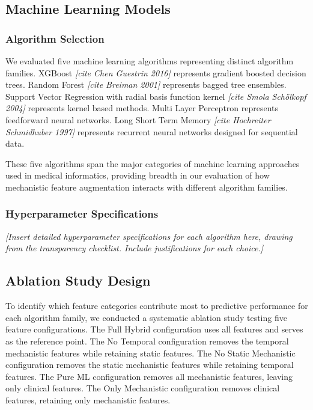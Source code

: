 \documentclass[11pt,a4paper]{article}
\newcommand{\placeholder}[1]{\textcolor{placeholdergray}{\textit{[#1]}}}
\begin{document}
\subsection{Machine Learning Models}

\subsubsection{Algorithm Selection}

We evaluated five machine learning algorithms representing distinct
algorithm families. XGBoost \placeholder{cite Chen Guestrin 2016}
represents gradient boosted decision trees. Random Forest
\placeholder{cite Breiman 2001} represents bagged tree ensembles.
Support Vector Regression with radial basis function kernel
\placeholder{cite Smola Schölkopf 2004} represents kernel based
methods. Multi Layer Perceptron represents feedforward neural networks.
Long Short Term Memory \placeholder{cite Hochreiter Schmidhuber 1997}
represents recurrent neural networks designed for sequential data.

These five algorithms span the major categories of machine learning
approaches used in medical informatics, providing breadth in our
evaluation of how mechanistic feature augmentation interacts with
different algorithm families.

\subsubsection{Hyperparameter Specifications}

\placeholder{Insert detailed hyperparameter specifications for each
algorithm here, drawing from the transparency checklist. Include
justifications for each choice.}

\subsection{Ablation Study Design}

To identify which feature categories contribute most to predictive
performance for each algorithm family, we conducted a systematic
ablation study testing five feature configurations. The Full Hybrid
configuration uses all features and serves as the reference point.
The No Temporal configuration removes the temporal mechanistic features
while retaining static features. The No Static Mechanistic configuration
removes the static mechanistic features while retaining temporal features.
The Pure ML configuration removes all mechanistic features, leaving
only clinical features. The Only Mechanistic configuration removes
clinical features, retaining only mechanistic features.
\end{document}

